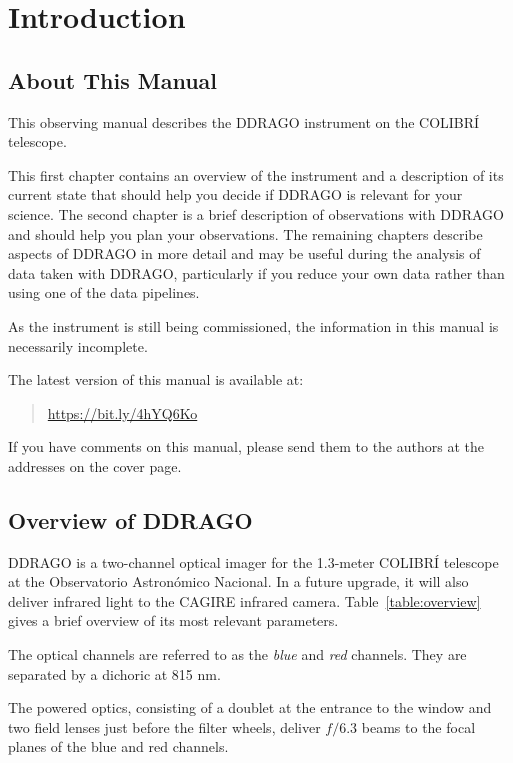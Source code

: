 \chapter{Introduction}

\section{About This Manual}

This observing manual describes the DDRAGO instrument on the COLIBRÍ telescope. 

This first chapter contains an overview of the instrument and a description of its current state that should help you decide if DDRAGO is relevant for your science. The second chapter is a brief description of observations with DDRAGO and should help you plan your observations. The remaining chapters describe aspects of DDRAGO in more detail and may be useful during the analysis of data taken with DDRAGO, particularly if you reduce your own data rather than using one of the data pipelines.

As the instrument is still being commissioned, the information in this manual is necessarily incomplete.

The latest version of this manual is available at:

\begin{quote}
\url{https://bit.ly/4hYQ6Ko}
\end{quote}

If you have comments on this manual, please send them to the authors at the addresses on the cover page.

\section{Overview of DDRAGO}

DDRAGO is a two-channel optical imager for the 1.3-meter COLIBRÍ telescope at the Observatorio Astronómico Nacional. In a future upgrade, it will also deliver infrared light to the CAGIRE infrared camera. Table~\ref{table:overview} gives a brief overview of its most relevant parameters.

The optical channels are referred to as the \emph{blue} and \emph{red} channels. They are separated by a dichoric at 815 nm. 

The powered optics, consisting of a doublet at the entrance to the window and two field lenses just before the filter wheels, deliver $f/6.3$ beams to the focal planes of the blue and red channels.

